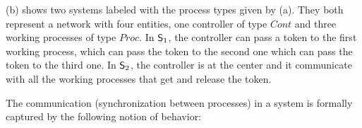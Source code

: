 % 

\begin{example}
   (b) shows two systems labeled with the process
  types given by  (a). They both represent a
  network with four entities, one controller of type $\mathit{Cont}$
  and three working processes of type $\mathit{Proc}$. In $\mathsf{S}_1$,
  the controller can pass a token to the first working process, which
  can pass the token to the second one which can pass the token to the
  third one. In $\mathsf{S}_2$, the controller is at the center and it
  communicate with all the working processes that get and release the
  token.
\end{example}

% 
% 

The communication (\ie synchronization between processes) in a
system is formally captured by the following notion of behavior:

